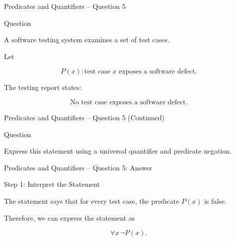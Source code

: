 
\begin{frame}{Predicates and Quantifiers -- Question 5}

\begin{block}{Question}

A software testing system examines a set of test cases.

Let

$$
P(x):\text{test case $x$ exposes a software defect}.
$$

The testing report states:

$$
\text{No test case exposes a software defect.}
$$

\end{block}

\end{frame}

\begin{frame}{Predicates and Quantifiers -- Question 5 (Continued)}

\begin{block}{Question}

Express this statement using a universal quantifier and predicate
negation.

\end{block}

\end{frame}


\begin{frame}{Predicates and Quantifiers -- Question 5: Answer}

\begin{exampleblock}{Step 1: Interpret the Statement}

The statement says that for every test case, the predicate $P(x)$ is
false.

Therefore, we can express the statement as

$$
\forall x\,\neg P(x).
$$

\end{exampleblock}

\end{frame}


